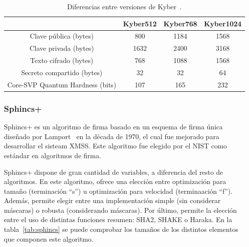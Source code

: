\begin{table}[H]
    \centering
    \begin{tabular}{|c|c|c|c|}
    \hline
                                & \textbf{Kyber512}     & \textbf{Kyber768}    & \textbf{Kyber1024}   \\ \hline
    Clave pública (bytes)       & 800                   & 1184                 & 1568                 \\ \hline
    Clave privada (bytes)       & 1632                  & 2400                 & 3168                 \\ \hline
    Texto cifrado (bytes)       & 768                   & 1088                 & 1568                 \\ \hline
    Secreto compartido (bytes)  & 32                    & 32                   & 64                   \\ \hline
    Core-SVP Quantum Hardness (bits)& 107                    & 165                   & 232                   \\ \hline
    \end{tabular}
    \caption{Diferencias entre versiones de Kyber~\cite{kyber_spec}.}
    \label{tab:kyber}
\end{table}

\subsubsection{Sphincs+}\label{subsubsec:sphincs}

Sphincs+ es un algoritmo de firma basado en un esquema de firma única diseñado por Lamport~\cite{lamport1979constructing} en la década de 1970, el cual fue mejorado para desarrollar el sisteam XMSS.
Este algoritmo fue elegido por el \ac{NIST} como estándar en algoritmos de firma.

Sphincs+ dispone de gran cantidad de variables, a diferencia del resto de algoritmos.
En este algoritmo, ofrece una elección entre optimización para tamaño (terminación ``s'') u optimización para velocidad (terminaación ``f'').
Además, permite elegir entre una implementación simple (sin considerar máscaras) o robusta (considerando máscaras).
Por último, permite la elección entre el uso de distintas funciones resumen: SHA2, SHAKE o Haraka.
En la tabla~\ref{tab:sphincs} se puede comprobar los tamaños de los distintos elementos que componen este algoritmo.

